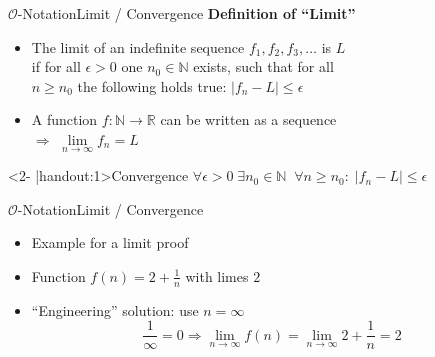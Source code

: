 \begin{frame}{$\mathcal{O}$-Notation}{Limit / Convergence}
  \label{slide:limit}
  \textbf{Definition of \enquote{Limit}}
  \begin{itemize}
    \item
      The limit of an indefinite sequence $f_1, f_2, f_3, \ldots$ is $L$\\
      if for all $\epsilon > 0$ one $n_0 \in \mathbb{N}$ exists,
      such that for all\\
      $n \geq n_0$ the following holds true:
      $\left| f_n - L \right| \leq \epsilon$
    \item
      A function $f\!: \mathbb{N} \rightarrow \mathbb{R}$ can be written as a
      sequence\\
      $\Rightarrow$ $\lim\limits_{n \rightarrow \infty} f_n = L$
  \end{itemize}
  \begin{block}<2- |handout:1>{Convergence}
    \begin{math}
      \forall \epsilon > 0 \; \exists n_0 \in \mathbb{N} \;\;
      \forall n \geq n_0 \! : \; \left| f_n - L \right| \leq \epsilon
    \end{math}
  \end{block}
\end{frame}


\begin{frame}{$\mathcal{O}$-Notation}{Limit / Convergence}
  \begin{itemize}
  \item Example for a limit proof
  \item Function $f(n) = 2 + \frac{1}{n}$ with limes $2$
  \item \enquote{Engineering} solution: use $n=\infty{}$
    \begin{displaymath}
      \frac{1}{\infty} = 0 \Rightarrow \lim_{n \to \infty} f(n)
        = \lim_{n \to \infty} 2 + \dfrac{1}{n}
        = 2
    \end{displaymath}
  \end{itemize}
\end{frame}


